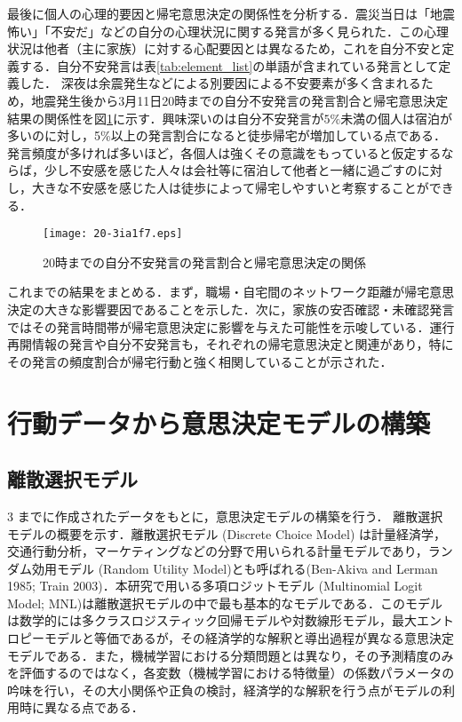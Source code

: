 \documentclass[japanese]{jnlp_1.4}
\begin{document}
最後に個人の心理的要因と帰宅意思決定の関係性を分析する．震災当日は「地震怖い」「不安だ」などの自分の心理状況に関する発言が多く見られた．この心理状況は他者（主に家族）に対する心配要因とは異なるため，これを自分不安と定義する．自分不安発言は表\ref{tab:element_list}の単語が含まれている発言として定義した．
深夜は余震発生などによる別要因による不安要素が多く含まれるため，地震発生後から3月11日20時までの自分不安発言の発言割合と帰宅意思決定結果の関係性を図\ref{fig:anxiety}に示す．興味深いのは自分不安発言が$5\%$未満の個人は宿泊が多いのに対し，5\%以上の発言割合になると徒歩帰宅が増加している点である．
発言頻度が多ければ多いほど，各個人は強くその意識をもっていると仮定するならば，少し不安感を感じた人々は会社等に宿泊して他者と一緒に過ごすのに対し，大きな不安感を感じた人は徒歩によって帰宅しやすいと考察することができる．

\begin{figure}[t]
\begin{center}
\texttt{[image: 20-3ia1f7.eps]}
\end{center}
\caption{20時までの自分不安発言の発言割合と帰宅意思決定の関係}
\label{fig:anxiety}
\end{figure}

これまでの結果をまとめる．まず，職場・自宅間のネットワーク距離が帰宅意思決定の大きな影響要因であることを示した．次に，家族の安否確認・未確認発言ではその発言時間帯が帰宅意思決定に影響を与えた可能性を示唆している．運行再開情報の発言や自分不安発言も，それぞれの帰宅意思決定と関連があり，特にその発言の頻度割合が帰宅行動と強く相関していることが示された．



\section{行動データから意思決定モデルの構築}

\subsection{離散選択モデル}

3 までに作成されたデータをもとに，意思決定モデルの構築を行う．
離散選択モデルの概要を示す．離散選択モデル (Discrete Choice Model) は計量経済学，交通行動分析，マーケティングなどの分野で用いられる計量モデルであり，ランダム効用モデル (Random Utility Model)とも呼ばれる(Ben-Akiva and Lerman 1985; Train 2003)．本研究で用いる多項ロジットモデル (Multinomial Logit Model; MNL)は離散選択モデルの中で最も基本的なモデルである．このモデルは数学的には多クラスロジスティック回帰モデルや対数線形モデル，最大エントロピーモデルと等価であるが，その経済学的な解釈と導出過程が異なる意思決定モデルである．また，機械学習における分類問題とは異なり，その予測精度のみを評価するのではなく，各変数（機械学習における特徴量）の係数パラメータの吟味を行い，その大小関係や正負の検討，経済学的な解釈を行う点がモデルの利用時に異なる点である．
\end{document}
